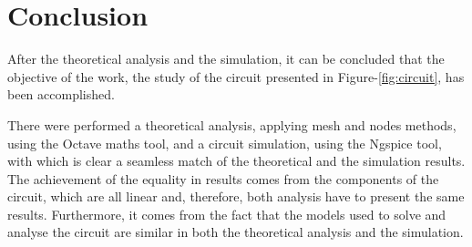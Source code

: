 \section{Conclusion}
\label{sec:conclusion}

After the theoretical analysis and the simulation, it can be concluded that the
objective of the work, the study of the circuit presented in Figure-\ref{fig:circuit},
has been accomplished.\par




There were performed a theoretical analysis, applying mesh and nodes methods,
using the Octave maths tool, and a circuit simulation, using the Ngspice tool, with which
is clear a seamless match of the theoretical and the simulation results. The achievement
of the equality in results comes from the components of the circuit, which are all linear
and, therefore, both analysis have to present the same results. Furthermore, it comes from
the fact that the models used to solve and analyse the circuit are similar in both the
theoretical analysis and the simulation.


